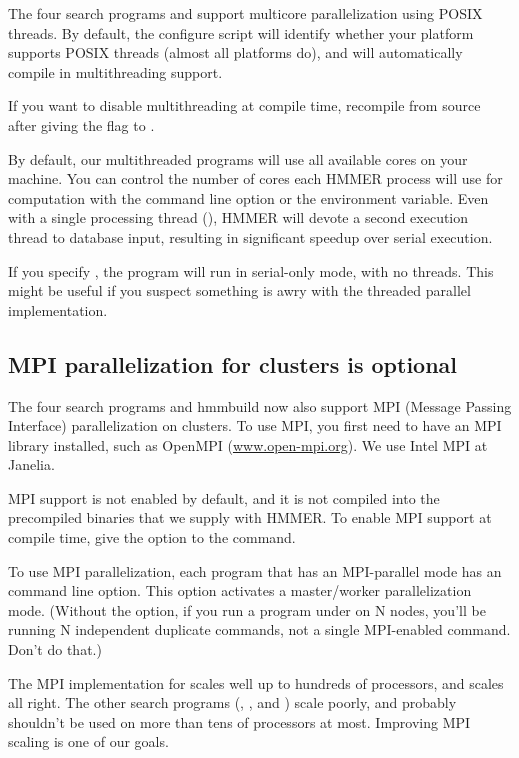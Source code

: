 The four search programs and  support multicore
parallelization using POSIX threads. By default, the configure script
will identify whether your platform supports POSIX threads (almost all
platforms do), and will automatically compile in multithreading
support.

If you want to disable multithreading at compile time, recompile from
source after giving the  flag to
.

By default, our multithreaded programs will use all available cores on
your machine. You can control the number of cores each HMMER process
will use for computation with the  command line
option or the  environment variable. Even with a
single processing thread (), HMMER will devote a second
execution thread to database input, resulting in significant speedup
over serial execution.

If you specify , the program will run in serial-only
mode, with no threads. This might be useful if you suspect something
is awry with the threaded parallel implementation.

\subsection{MPI parallelization for clusters is optional}

The four search programs and hmmbuild now also support MPI (Message
Passing Interface) parallelization on clusters.  To use MPI, you first
need to have an MPI library installed, such as OpenMPI
(\url{www.open-mpi.org}). We use Intel MPI at Janelia.

MPI support is not enabled by default, and it is not compiled into the
precompiled binaries that we supply with HMMER. To enable MPI support
at compile time, give the  option to the
 command.

To use MPI parallelization, each program that has an MPI-parallel mode
has an  command line option. This option activates a
master/worker parallelization mode. (Without the  option,
if you run a program under  on N nodes, you'll be
running N independent duplicate commands, not a single MPI-enabled
command. Don't do that.)

The MPI implementation for  scales well up to hundreds
of processors, and  scales all right. The other search
programs (, , and ) scale
poorly, and probably shouldn't be used on more than tens of processors
at most. Improving MPI scaling is one of our goals.


